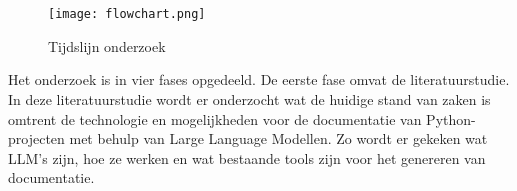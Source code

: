 
\chapter{}%
\label{ch:methodologie}

\begin{figure}[h]
    \centering
    \texttt{[image: flowchart.png]}
    \caption{Tijdslijn onderzoek}
    \label{fig:flowchart}
\end{figure}

Het onderzoek is in vier fases opgedeeld. De eerste fase omvat de literatuurstudie.
In deze literatuurstudie wordt er onderzocht wat de huidige stand van zaken is omtrent de technologie en mogelijkheden voor de documentatie van Python-projecten met behulp van Large Language Modellen.
Zo wordt er gekeken wat LLM's zijn, hoe ze werken en wat bestaande tools zijn voor het genereren van documentatie.

